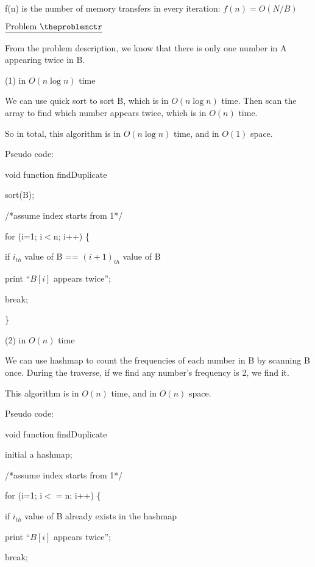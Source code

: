 \documentclass[11pt]{article}
\def\pp{\par\noindent}
\begin{document}
f(n) is the number of memory transfers in every iteration: $f(n)=O(N/B)$

\vfill
\newpage
\addtocounter{problemctr}{1}
\bigskip
\noindent
$\underline{\rm Problem\ \theproblemctr}$\pp
From the problem description, we know that there is only one number in A appearing twice in B.

\noindent
(1) in $O(n\log n)$ time

We can use quick sort to sort B, which is in $O(n\log n)$ time. Then scan the array to find which number appears twice, which is in $O(n)$ time.

So in total, this algorithm is in $O(n\log n)$ time, and in $O(1)$ space.

\bigskip

Pseudo code:

void function findDuplicate

sort(B);

/*assume index starts from 1*/

for (i=1; i$<$n; i++) \{
	
	\hspace{1.0 cm}if $i_{th}$ value of B == $(i+1)_{th}$ value of B

		\hspace{1.5 cm}print ``$B[i]$ appears twice'';

		\hspace{1.5 cm}break;


\}

\bigskip
\bigskip
\noindent
(2) in $O(n)$ time

We can use hashmap to count the frequencies of each number in B by scanning B once. During the traverse, if we find any number's frequency is 2, we find it.

This algorithm is in $O(n)$ time, and in $O(n)$ space.

\bigskip

Pseudo code:

void function findDuplicate

initial a hashmap;

/*assume index starts from 1*/

for (i=1; i$<=$n; i++) \{
	
	\hspace{1.0 cm}if $i_{th}$ value of B already exists in the hashmap

		\hspace{1.5 cm}print ``$B[i]$ appears twice'';

		\hspace{1.5 cm}break;
\end{document}
